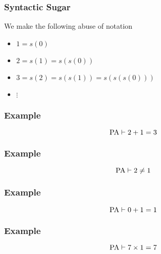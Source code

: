 \documentclass{beamer}
\theoremstyle{indentDefn} \newtheorem{defn}[]{Definition}
\begin{document}
\begin{frame}
	\frametitle{Syntactic Sugar}
	
	We make the following abuse of notation 
	\begin{center}
		\begin{itemize}
			\item[] $1 = s(0)$
			\item[] $2 = s(1) = s(s(0))$
			\item[] $3 = s(2) = s(s(1)) = s(s(s(0)))$
			\item[] $\vdots$
		\end{itemize}
	\end{center}
	
\end{frame}

\begin{frame}
	\frametitle{Example}
	
	$$ \text{PA} \vdash 2 + 1 = 3$$
	
	\vspace{60mm}
	
	
\end{frame}

\begin{frame}
	\frametitle{Example}
	
	$$ \text{PA} \vdash 2 \neq 1$$

	\vspace{65mm}
	
	
\end{frame}

\begin{frame}
	\frametitle{Example}
	
	$$ \text{PA} \vdash 0 + 1 = 1$$
	
	\vspace{65mm}
	
\end{frame}

\begin{frame}
	\frametitle{Example}
	
	$$ \text{PA} \vdash 7 \times 1 = 7$$
	
	\vspace{65mm}
	
\end{frame}
\end{document}
